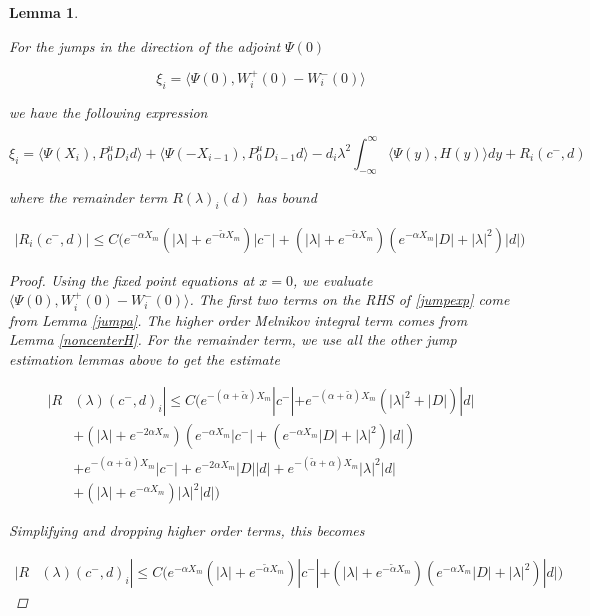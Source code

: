 \documentclass[12pt]{article}
\newtheorem{lemma}{Lemma}
\begin{document}
\begin{lemma}\label{jump}

For the jumps in the direction of the adjoint $\Psi(0)$

\[
\xi_i = \langle \Psi(0), W_i^+(0) - W_i^-(0) \rangle
\]

we have the following expression

\begin{equation}\label{jumpexp}
\xi_i = \langle \Psi(X_i), P^u_0 D_i d \rangle + \langle \Psi(-X_{i-1}), P^u_0 D_{i-1} d \rangle - d_i \lambda^2 \int_{-\infty}^\infty \langle \Psi(y), H(y) \rangle dy + R_i(c^-, d)
\end{equation}

where the remainder term $R(\lambda)_i(d)$ has bound

\begin{align}\label{remainder1}
|R_i(c^-, d)| \leq C \Big( e^{-\alpha X_m}(|\lambda| + e^{-\tilde{\alpha} X_m} )|c^-| + 
(|\lambda| + e^{-\tilde{\alpha} X_m} )( e^{-\alpha X_m} |D| + |\lambda|^2)|d| \Big)
\end{align}

\begin{proof}
Using the fixed point equations at $x = 0$, we evaluate $\langle \Psi(0), W_i^+(0) - W_i^-(0) \rangle$. The first two terms on the RHS of \eqref{jumpexp} come from Lemma \ref{jumpa}. The higher order Melnikov integral term comes from Lemma \ref{noncenterH}. For the remainder term, we use all the other jump estimation lemmas above to get the estimate

\begin{align*}
|R&(\lambda)(c^-, d)_i| \leq C \Big( e^{-(\alpha + \tilde{\alpha})X_m} |c^-| + e^{-(\alpha + \tilde{\alpha})X_m}(|\lambda|^2 + |D| )|d| \\
&+ (|\lambda| + e^{-2 \alpha X_m})(e^{-\alpha X_m}|c^-| + (e^{-\alpha X_m}|D|+ |\lambda|^2 )|d|) \\
&+ e^{-(\alpha + \tilde{\alpha}) X_m} |c^-| + e^{-2 \alpha X_m} |D||d| + e^{-(\tilde{\alpha} + \alpha) X_m} |\lambda|^2 |d| \\
&+ (|\lambda| + e^{-\alpha X_m} ) |\lambda|^2 |d|
\Big)
\end{align*}

Simplifying and dropping higher order terms, this becomes

\begin{align*}
|R&(\lambda)(c^-, d)_i| \leq C \Big( e^{-\alpha X_m}(|\lambda| + e^{-\tilde{\alpha} X_m} )|c^-| + 
(|\lambda| + e^{-\tilde{\alpha} X_m} )( e^{-\alpha X_m} |D| + |\lambda|^2)|d| \Big)
\end{align*}

\end{proof}
\end{lemma}
\end{document}
